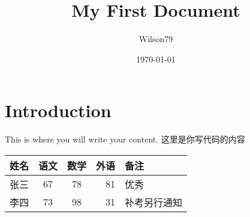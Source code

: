 \documentclass{article}
\title{My First Document}
\author{Wilson79}
\date{\today}
\begin{document}
 

	\section{Introduction} This is where you will write your content. 这里是你写代码的内容 

	\begin{tabular} {|l || c | c | r | p{1.5cm}|} 
	\hline
	姓名 & 语文 & 数学 & 外语 & 备注 \\ 
	\hline \hline
	张三 & 67 &78&81& 优秀 \\
	\hline
	李四 & 73 &98&31& 补考另行通知 \\
	\hline

	\end{tabular}
\end{document}
